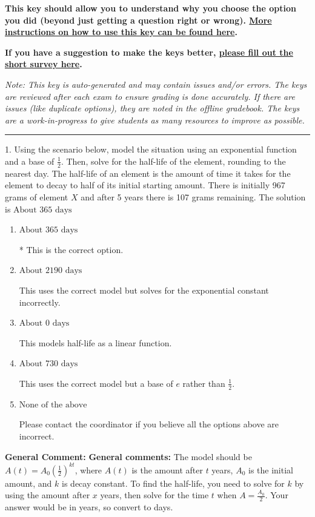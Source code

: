 \documentclass{extbook}[14pt]
\begin{document}
\textbf{This key should allow you to understand why you choose the option you did (beyond just getting a question right or wrong). \href{https://xronos.clas.ufl.edu/mac1105spring2020/courseDescriptionAndMisc/Exams/LearningFromResults}{More instructions on how to use this key can be found here}.}

\textbf{If you have a suggestion to make the keys better, \href{https://forms.gle/CZkbZmPbC9XALEE88}{please fill out the short survey here}.}

\textit{Note: This key is auto-generated and may contain issues and/or errors. The keys are reviewed after each exam to ensure grading is done accurately. If there are issues (like duplicate options), they are noted in the offline gradebook. The keys are a work-in-progress to give students as many resources to improve as possible.}

\rule{\textwidth}{0.4pt}

1. Using the scenario below, model the situation using an exponential function and a base of $\frac{1}{2}$. Then, solve for the half-life of the element, rounding to the nearest day.
The half-life of an element is the amount of time it takes for the element to decay to half of its initial starting amount. There is initially 967 grams of element $X$ and after 5 years there is 107 grams remaining. 
The solution is $ \text{About } 365 \text{ days} $ 

\begin{enumerate}[label=\Alph*.] 
\item $ \text{About } 365 \text{ days} $ 

 * This is the correct option. 
\item $ \text{About } 2190 \text{ days} $ 

 This uses the correct model but solves for the exponential constant incorrectly. 
\item $ \text{About } 0 \text{ days} $ 

 This models half-life as a linear function. 
\item $ \text{About } 730 \text{ days} $ 

 This uses the correct model but a base of $e$ rather than $\frac{1}{2}$. 
\item $ \text{None of the above} $ 

 Please contact the coordinator if you believe all the options above are incorrect. 
\end{enumerate} 
 
\textbf{General Comment:} \textbf{General comments:} The model should be $A(t) = A_0 (\frac{1}{2})^{kt}$, where $A(t)$ is the amount after $t$ years, $A_0$ is the initial amount, and $k$ is decay constant. To find the half-life, you need to solve for $k$ by using the amount after $x$ years, then solve for the time $t$ when $A = \frac{A_0}{2}$. Your answer would be in years, so convert to days. 
\end{document}
